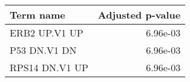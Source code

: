 \begin{tabular}{lr}
\toprule
     Term name &  Adjusted p-value \\
\midrule
 ERB2 UP.V1 UP &          6.96e-03 \\
  P53 DN.V1 DN &          6.96e-03 \\
RPS14 DN.V1 UP &          6.96e-03 \\
\bottomrule
\end{tabular}

